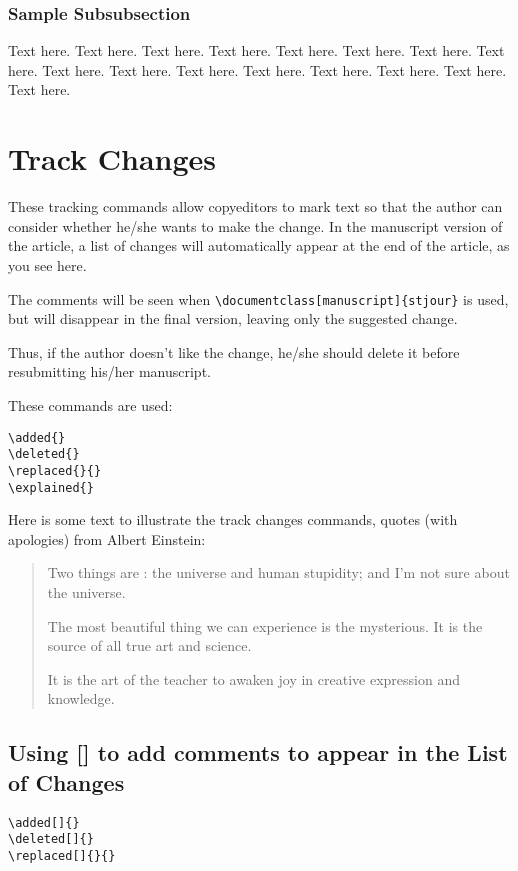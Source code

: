 \documentclass[manuscript]{stjour}
\begin{document}
\subsubsection{Sample Subsubsection}
Text here. Text here. Text here. Text here.
Text here. Text here. Text here. Text here.
Text here. Text here. Text here. Text here.
Text here. Text here. Text here. Text here.


\newpage
\section{Track Changes}
These tracking commands allow copyeditors to mark text so
that the author can consider whether he/she wants to make
the change. In the manuscript version of the article, 
a list of changes will automatically appear at the end of the
article, as you see here.

The comments will be seen when
\verb+\documentclass[manuscript]{stjour}+
is used, but will disappear in the final version,
leaving only the suggested change.

Thus, if the author doesn't like the change, he/she should
delete it before resubmitting his/her manuscript.

These commands are used:
\begin{verbatim}
\added{}
\deleted{}
\replaced{}{}
\explained{}
\end{verbatim}

Here is some text to illustrate the track changes
commands, quotes (with apologies) from Albert Einstein:

\begin{quotation}
Two things are : the universe and
human stupidity;  and I'm not sure about the universe.

The most beautiful thing we can experience is the mysterious. It is
the source of all true art and science. 

It is the  art of the teacher to awaken joy in creative
expression and knowledge.
\end{quotation}

\subsection{Using [] to add comments to appear in the List of Changes}

\begin{verbatim}
\added[]{}
\deleted[]{}
\replaced[]{}{}
\end{verbatim}
\end{document}
